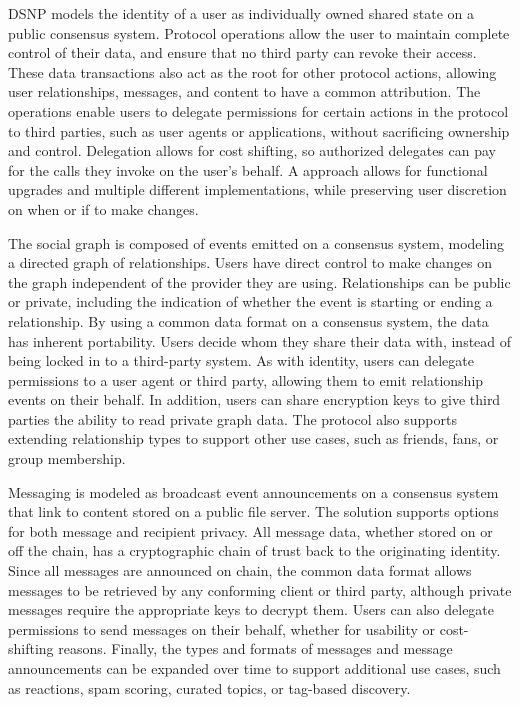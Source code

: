 \documentclass[12pt,letterpaper]{article}
\begin{document}
DSNP models the identity of a user as individually owned shared state on a public consensus
system. Protocol operations allow the user to maintain complete control of their data, and
ensure that no third party can revoke their access. These data transactions also act as the
root for other protocol actions, allowing user relationships, messages, and content to have
a common attribution. The operations enable users to delegate permissions for certain
actions in the protocol to third parties, such as user agents or applications, without
sacrificing ownership and control. Delegation allows for cost shifting, so authorized
delegates can pay for the calls they invoke on the user's behalf.  A  approach allows for functional upgrades and multiple different implementations,
while preserving user discretion on when or if to make changes.

The social graph is composed of events emitted on a consensus system, modeling a directed
graph of  relationships. Users have direct control to make changes on the graph
independent of the provider they are using. Relationships can be public or private,
including the indication of whether the event is starting or ending a relationship. By using
a common data format on a consensus system, the data has inherent portability. Users decide
whom they share their data with, instead of being locked in to a third-party system. As with
identity, users can delegate permissions to a user agent or third party, allowing them to
emit relationship events on their behalf. In addition, users can share encryption keys to
give third parties the ability to read private graph data. The protocol also supports
extending relationship types to support other use cases, such as friends, fans, or group
membership.

Messaging is modeled as broadcast event announcements on a consensus system that link to
content stored on a public file server. The solution supports options for both message and
recipient privacy. All message data, whether stored on or off the chain, has a cryptographic
chain of trust back to the originating identity. Since all messages are announced on chain,
the common data format allows messages to be retrieved by any conforming client or third
party, although private messages require the appropriate keys to decrypt them. Users can
also delegate permissions to send messages on their behalf, whether for usability or
cost-shifting reasons. Finally, the types and formats of messages and message announcements
can be expanded over time to support additional use cases, such as reactions, spam scoring,
curated topics, or tag-based discovery.
\end{document}

